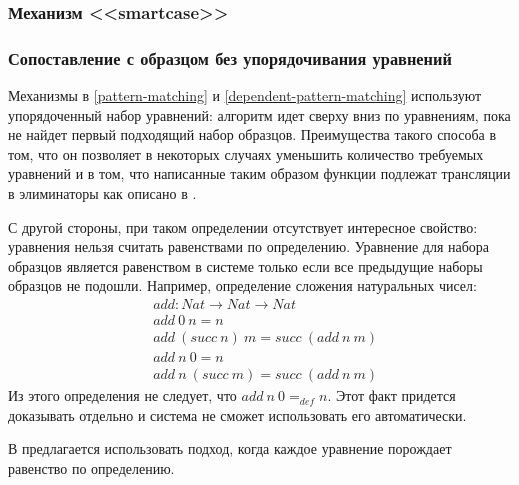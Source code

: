 \subsubsection{Механизм <<smartcase>>}


\subsubsection{Сопоставление с образцом без упорядочивания уравнений}

Механизмы в \ref{pattern-matching} и \ref{dependent-pattern-matching} используют
упорядоченный набор уравнений: алгоритм идет сверху вниз по уравнениям, пока не
найдет первый подходящий набор образцов. Преимущества такого способа в том,
что он позволяет в некоторых случаях уменьшить количество требуемых уравнений
\cite{overlapping-and-order-independent-patterns} и в том, что написанные таким
образом функции подлежат трансляции в элиминаторы как описано в
\cite{eliminating-dependent-pattern-matching}.

С другой стороны, при таком определении отсутствует интересное свойство:
уравнения нельзя считать равенствами по определению. Уравнение для набора
образцов является равенством в системе только если все предыдущие наборы
образцов не подошли. Например, определение сложения натуральных чисел:
\begin{align*}
&add : Nat \to Nat \to Nat\\
&add\ 0\ n = n\\
&add\ (succ\ n)\ m = succ\ (add\ n\ m)\\
&add\ n\ 0 = n\\
&add\ n\ (succ\ m) = succ\ (add\ n\ m)
\end{align*}
Из этого определения не следует, что \(add\ n\ 0 =_{def} n\). Этот факт придется
доказывать отдельно и система не сможет использовать его автоматически.

В \cite{overlapping-and-order-independent-patterns} предлагается использовать
подход, когда каждое уравнение порождает равенство по определению.
